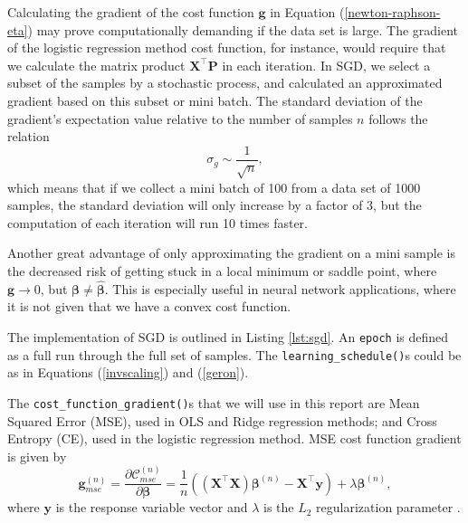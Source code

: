 \documentclass[]{article}
\begin{document}
\vspace{5mm}

Calculating the gradient of the cost function $\mathbf{g}$ in Equation (\ref{newton-raphson-eta}) may prove computationally demanding if the data set is large. The gradient of the logistic regression method cost function, for instance, would require that we calculate the matrix product $\mathbf{X}^\intercal \mathbf{P}$ in each iteration. In SGD, we select a subset of the samples by a stochastic process, and calculated an approximated gradient based on this subset or mini batch. The standard deviation of the gradient's expectation value relative to the number of samples $n$ follows the relation \cite{fys-stk4155-notes}
\begin{equation}
	\sigma_g \sim \frac{1}{\sqrt{n}},
\end{equation}
which means that if we collect a mini batch of 100 from a data set of 1000 samples, the standard deviation will only increase by a factor of 3, but the computation of each iteration will run 10 times faster.

Another great advantage of only approximating the gradient on a mini sample is the decreased risk of getting stuck in a local minimum or saddle point, where $\mathbf{g} \rightarrow 0$, but $\mathbf{\beta} \neq \mathbf{\hat{\beta}}$. This is especially useful in neural network applications, where it is not given that we have a convex cost function.

The implementation of SGD is outlined in Listing \ref{lst:sgd}. An \lstinline|epoch| is defined as a full run through the full set of samples. The \lstinline|learning_schedule()|s could be as in Equations (\ref{invscaling}) and (\ref{geron}). 

\vspace{5mm}

The \lstinline|cost_function_gradient()|s that we will use in this report are Mean Squared Error (MSE), used in OLS and Ridge regression methods; and Cross Entropy (CE), used in the logistic regression method. MSE cost function gradient is given by
\begin{equation} \label{cost-mse}
	\mathbf{g}_{mse}^{(n)} = \frac{\partial \mathcal{C}_{mse}^{(n)}}{\partial \mathbf{\beta}} = \frac{1}{n} ((\mathbf{X}^\intercal \mathbf{X}) \mathbf{\beta}^{(n)} - \mathbf{X}^\intercal \mathbf{y}) + \lambda \mathbf{\beta}^{(n)},
\end{equation}
where $\mathbf{y}$ is the response variable vector and $\lambda$ is the $L_2$ regularization parameter \cite{project1}. 
\end{document}
